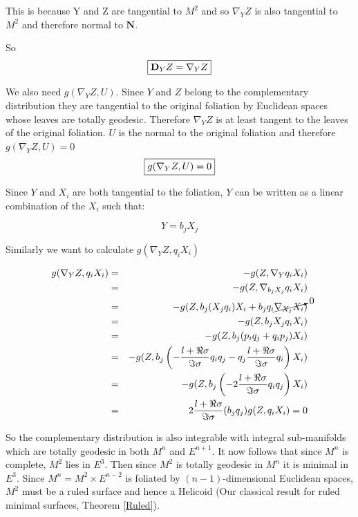 This is because Y and Z are tangential to $M^2$ and so $\nabla_YZ$ is also tangential to $M^2$ and therefore normal to $\mathbf N$.

So 
\begin{equation}
\framebox{$\mathbf D_YZ=\nabla_YZ$}
\label{Connections}
\end{equation}

We also need $g(\nabla_YZ,U)$. Since $Y$ and $Z$ belong to the complementary distribution they are tangential to the original foliation by Euclidean spaces whose leaves are totally geodesic.  Therefore $\nabla_YZ$ is at least tangent to the leaves of the original foliation.  $U$ is the normal to the original foliation and therefore $g(\nabla_YZ,U)=0$
\begin{equation}
\framebox{$g(\nabla_YZ,U)=0$}
\label{gNyzU}
\end{equation}

Since $Y$ and $X_i$ are both tangential to the foliation, $Y$ can be written as a linear combination of the $X_i$ such that:

\begin{equation}
Y=b_jX_j
\end{equation}

Similarly we want to calculate $g(\nabla_YZ, q_iX_i)$

\begin{eqnarray}
\nonumber
g(\nabla_YZ,q_iX_i) &=& -g(Z,\nabla_Yq_iX_i) \\
\nonumber
&=& -g(Z,\nabla_{b_jX_j}q_iX_i) \\
\nonumber
&=& -g(Z,b_j(X_jq_i)X_i + b_jq_i\cancelto{0}{\nabla_{X_j}{X_i}}) \\
\nonumber
&=& -g(Z,b_jX_jq_iX_i) \\
\nonumber
&=& -g(Z,b_j(p_iq_j+q_ip_j)X_i) \\
\nonumber
&=& -g(Z,b_j\left(-\frac{l+\Re\sigma}{\Im \sigma}q_iq_j - q_j\frac{l+\Re\sigma}{\Im\sigma}q_i\right)X_i) \\
\nonumber
&=& -g(Z,b_j\left(-2\frac{l+\Re \sigma}{\Im \sigma}q_iq_j\right)X_i) \\
\nonumber
&=& 2\frac{l+\Re\sigma}{\Im \sigma}(b_jq_j)g(Z,q_iX_i) = 0 
\end{eqnarray}

So the complementary distribution is also integrable with integral sub-manifolds which are totally geodesic in both $M^n$ and $E^{n+1}$. It now follows that since $M^n$ is complete, $M^2$ lies in $E^3$. Then since $M^2$ is totally geodesic in $M^n$ it is minimal in $E^3$. Since $M^n = M^2 \times E^{n-2}$ is foliated by $(n-1)$-dimensional Euclidean spaces, $M^2$ must be a ruled surface and hence a Helicoid (Our classical result for ruled minimal surfaces, Theorem \ref{Ruled}).

